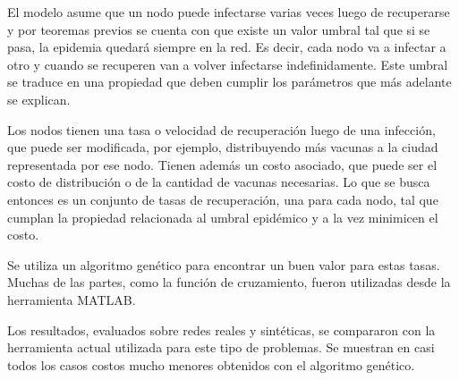 El modelo asume que un nodo puede infectarse varias veces luego de recuperarse y por teoremas previos se cuenta con que existe un valor umbral tal que si se pasa, la epidemia quedará siempre en la red. Es decir, cada nodo va a infectar a otro y cuando se recuperen van a volver infectarse indefinidamente. Este umbral se traduce en una propiedad que deben cumplir los parámetros que más adelante se explican.

Los nodos tienen una tasa o velocidad de recuperación luego de una infección, que puede ser modificada, por ejemplo, distribuyendo más vacunas a la ciudad representada por ese nodo. Tienen además un costo asociado, que puede ser el costo de distribución o de la cantidad de vacunas necesarias. Lo que se busca entonces es un conjunto de tasas de recuperación, una para cada nodo, tal que cumplan la propiedad relacionada al umbral epidémico y a la vez minimicen el costo.

Se utiliza un algoritmo genético para encontrar un buen valor para estas tasas. Muchas de las partes, como la función de cruzamiento, fueron utilizadas desde la herramienta MATLAB.

Los resultados, evaluados sobre redes reales y sintéticas, se compararon con la herramienta actual utilizada para este tipo de problemas. Se muestran en casi todos los casos costos mucho menores obtenidos con el algoritmo genético.

